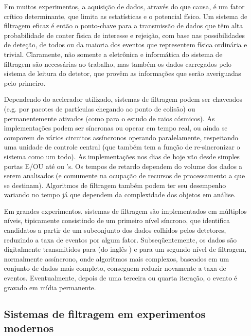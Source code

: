 Em muitos experimentos, a aquisição de dados, através do  que
causa, é um fator crítico determinante, que limita as estatísticas e o
potencial físico. Um sistema de filtragem eficaz é então o ponto-chave para a
transmissão de dados que têm alta probabilidade de conter física de interesse
e rejeição, com base nas possibilidades de deteção, de todos ou da maioria dos
eventos que representem física ordinária e trivial. Claramente, não somente a
eletrônica e informática do sistema de filtragem são necessárias ao trabalho,
mas também os dados carregados pelo sistema de leitura do detetor, que provêm
as informações que serão averiguadas pelo primeiro.

Dependendo do acelerador utilizado, sistemas de filtragem podem ser chaveados
(e.g. por pacotes de partículas chegando ao ponto de colisão) ou
permanentemente ativados (como para o estudo de raios cósmicos). As
implementações podem ser síncronas ou operar em tempo real, ou ainda
se comporem de vários circuitos assíncronos operando paralelamente,
respeitando uma unidade de controle central (que também tem a função de
re-sincronizar o sistema como um todo). As implementações nos dias de hoje vão
desde simples portas E/OU até  ou
's. Os tempos de retardo dependem do volume dos dados a serem
analisados (e comumente na ocupação de recursos de processamento a que se
destinam). Algoritmos de filtragem também podem ter seu desempenho variando no
tempo já que dependem da complexidade dos objetos em análise.

Em grandes experimentos, sistemas de filtragem são implementados em múltiplos
níveis, tipicamente consistindo de um primeiro nível síncrono, que identifica
candidatos a partir de um subconjunto dos dados colhidos pelos detetores,
reduzindo a taxa de eventos por algum fator. Subseqüentemente, os dados são
digitalmente transmitidos para  (do inglês
) e para um segundo nível de filtragem, normalmente assíncrono,
onde algoritmos mais complexos, baseados em um conjunto de dados mais
completo, conseguem reduzir novamente a taxa de eventos. Eventualmente,
depois de uma terceira ou quarta iteração, o evento é gravado em mídia
permanente.

\subsection{Sistemas de filtragem em experimentos modernos}

